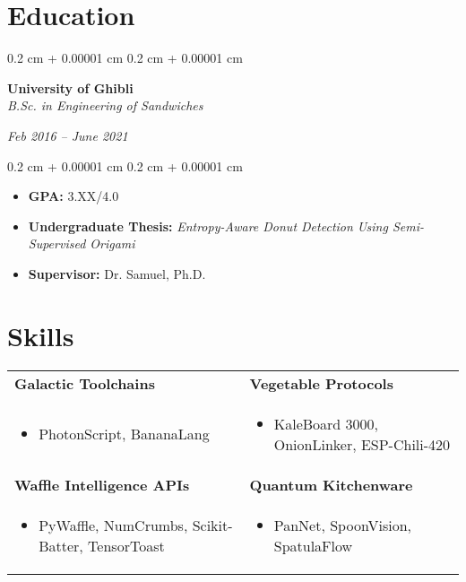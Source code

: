 \documentclass[10pt, letterpaper]{article}
\newenvironment{highlights}{
    \begin{itemize}[
        topsep=0.10 cm,
        parsep=0.10 cm,
        partopsep=0pt,
        itemsep=0pt,
        leftmargin=0.4 cm + 10pt
    ]
}{
    \end{itemize}
}
\newenvironment{onecolentry}{
    \begin{adjustwidth}{
        0.2 cm + 0.00001 cm
    }{
        0.2 cm + 0.00001 cm
    }
}{
    \end{adjustwidth}
}
\newenvironment{twocolentry}[2][]{
    \onecolentry
    \def\secondColumn{#2}
    \setcolumnwidth{\fill, 4.5 cm}
    \begin{paracol}{2}
}{
    \switchcolumn \raggedleft \secondColumn
    \end{paracol}
    \endonecolentry
}
\begin{document}
    \vspace{0.05 cm}
    
    \section{Education}
    
    \begin{twocolentry}{
        \textit{Feb 2016 – June 2021}}
        \textbf{University of Ghibli}\\
        \textit{B.Sc. in Engineering of Sandwiches}
    \end{twocolentry}
    
    \vspace{0.10 cm}
    
    \begin{onecolentry}
        \begin{highlights}
            \item \textbf{GPA:} 3.XX/4.0
            \item \textbf{Undergraduate Thesis:} \textit{Entropy-Aware Donut Detection Using Semi-Supervised Origami}
            \item \textbf{Supervisor:} Dr. Samuel, Ph.D.
        \end{highlights}
    \end{onecolentry}
    
    \vspace{0.05 cm}
    
    \section*{Skills}
    
    \noindent
    \begin{tabularx}{\textwidth}{@{}X X@{}}
        \textbf{Galactic Toolchains} & \textbf{Vegetable Protocols} \\
        \begin{highlights}
            \item PhotonScript, BananaLang
        \end{highlights} & 
        \begin{highlights}
            \item KaleBoard 3000, OnionLinker, ESP-Chili-420
        \end{highlights} \\[-0.2em]
    
        \textbf{Waffle Intelligence APIs} & \textbf{Quantum Kitchenware} \\
        \begin{highlights}
            \item PyWaffle, NumCrumbs, Scikit-Batter, TensorToast
        \end{highlights} & 
        \begin{highlights}
            \item PanNet, SpoonVision, SpatulaFlow
        \end{highlights} \\[-0.2em]
    \end{tabularx}
    
\end{document}
